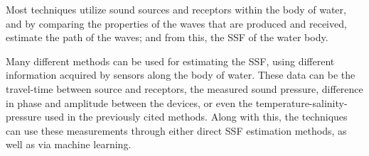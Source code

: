 Most techniques utilize sound sources and receptors within the body of water, and by comparing the properties of the waves that are produced and received, estimate the path of the waves; and from this, the SSF of the water body.

Many different methods can be used for estimating the SSF, using different information acquired by sensors along the body of water. These data can be the travel-time between source and receptors, the measured sound pressure, difference in phase and amplitude between the devices, or even the temperature-salinity-pressure used in the previously cited methods. Along with this, the techniques can use these measurements through either direct SSF estimation methods, as well as via machine learning.
